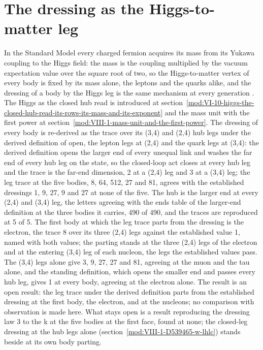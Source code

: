 \section{The dressing as the Higgs-to-matter leg}\label{mod:VI-10-D539753-w-yklg}
In the Standard Model every charged fermion acquires its mass from its Yukawa coupling to the Higgs field: the mass is the coupling multiplied by the vacuum expectation value over the square root of two, so the Higgs-to-matter vertex of every body is fixed by its mass alone, the leptons and the quarks alike, and the dressing of a body by the Higgs leg is the same mechanism at every generation \cite{Higgs1964,Weinberg1967,Yukawa1935}. The Higgs as the closed hub read is introduced at section~\ref{mod:VI-10-higgs-the-closed-hub-read-its-rows-its-mass-and-its-exponent} and the mass unit with the first power at section~\ref{mod:VIII-1-mass-unit-and-the-first-power}.
The dressing of every body is re-derived as the trace over its (3,4) and (2,4) hub legs under the derived definition of open, the lepton legs at (2,4) and the quark legs at (3,4): the derived definition opens the larger end of every unequal link and washes the far end of every hub leg on the state, so the closed-loop act closes at every hub leg and the trace is the far-end dimension, 2 at a (2,4) leg and 3 at a (3,4) leg; the leg trace at the five bodies, 8, 64, 512, 27 and 81, agrees with the established dressings 1, 9, 27, 9 and 27 at none of the five.
The hub is the larger end at every (2,4) and (3,4) leg, the letters agreeing with the ends table of the larger-end definition at the three bodies it carries, 490 of 490, and the traces are reproduced at 5 of 5. The first body at which the leg trace parts from the dressing is the electron, the trace 8 over its three (2,4) legs against the established value 1, named with both values; the parting stands at the three (2,4) legs of the electron and at the entering (3,4) leg of each nucleon, the legs the established values pass. The (3,4) legs alone give 3, 9, 27, 27 and 81, agreeing at the muon and the tau alone, and the standing definition, which opens the smaller end and passes every hub leg, gives 1 at every body, agreeing at the electron alone.
The result is an open result: the leg trace under the derived definition parts from the established dressing at the first body, the electron, and at the nucleons; no comparison with observation is made here.
What stays open is a result reproducing the dressing law 3 to the k at the five bodies at the first face, found at none; the closed-leg dressing at the hub legs alone (section~\ref{mod:VIII-1-D539465-w-lhlc}) stands beside at its own body parting.
